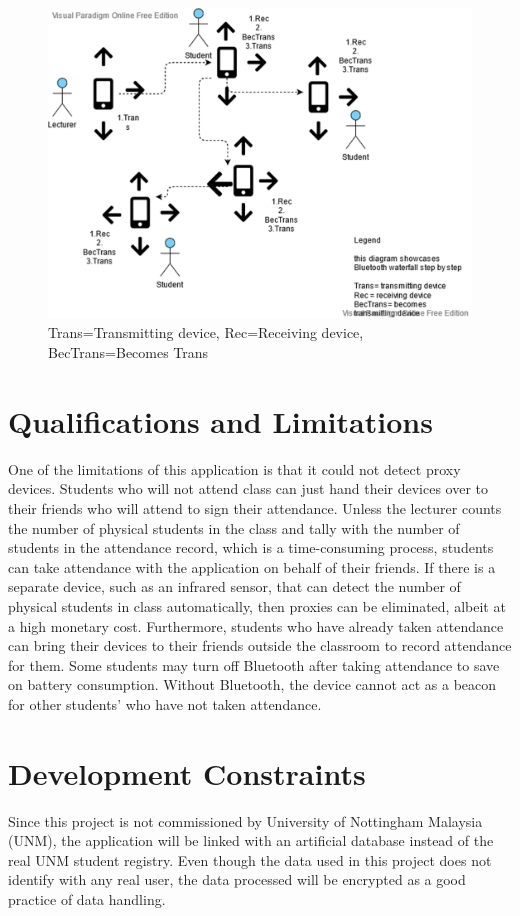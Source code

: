\documentclass[../report.tex]{subfiles}
\begin{document}
\begin{figure}[H]
\centering
\includegraphics[width=.75\textwidth]{./images/02/02-solution-design.png}
\caption{Trans=Transmitting device, Rec=Receiving device, BecTrans=Becomes Trans}
\label{fig:solution-design}
\end{figure}

\section{Qualifications and Limitations}
One of the limitations of this application is that it could not detect proxy devices. Students who will not attend class can just hand their devices over to their friends who will attend to sign their attendance. Unless the lecturer counts the number of physical students in the class and tally with the number of students in the attendance record, which is a time-consuming process, students can take attendance with the application on behalf of their friends. If there is a separate device, such as an infrared sensor, that can detect the number of physical students in class automatically, then proxies can be eliminated, albeit at a high monetary cost. Furthermore, students who have already taken attendance can bring their devices to their friends outside the classroom to record attendance for them. Some students may turn off Bluetooth after taking attendance to save on battery consumption. Without Bluetooth, the device cannot act as a beacon for other students’ who have not taken attendance.

\section{Development Constraints}
Since this project is not commissioned by University of Nottingham Malaysia (UNM), the application will be linked with an artificial database instead of the real UNM student registry. Even though the data used in this project does not identify with any real user, the data processed will be encrypted as a good practice of data handling.
\end{document}

